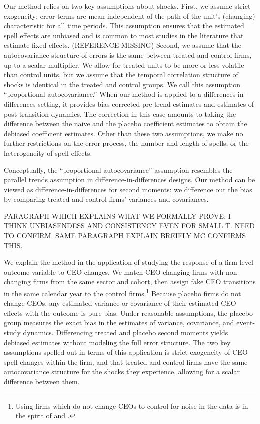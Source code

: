 \documentclass[11pt,a4paper]{article}
\begin{document}
Our method relies on two key assumptions about shocks. First, we assume strict exogeneity: error terms are mean independent of the path of the unit's (changing) characteristic for all time periods. This assumption ensures that the estimated spell effects are unbiased and is common to most studies in the literature that estimate fixed effects. (REFERENCE MISSING) Second, we assume that the autocovariance structure of errors is the same between treated and control firms, up to a scalar multiplier. We allow for treated units to be more or less volatile than control units, but we assume that the temporal correlation structure of shocks is identical in the treated and control groups. We call this assumption ``proportional autocovariance.'' When our method is applied to a differences-in-differences setting, it  provides bias corrected pre-trend estimates and estimates of post-transition dynamics. The correction in this case amounts to taking the difference between the naive and the placebo coefficient estimates to obtain the debiased coefficient estimates. Other than these two assumptions, we make no further restrictions on the error process, the number and length of spells, or the heterogeneity of spell effects.

Conceptually, the ``proportional autocovariance'' assumption resembles the parallel trends assumption in difference-in-differences designs. Our method can be viewed as difference-in-differences for second moments: we difference out the bias by comparing treated and control firms' variances and covariances. 

PARAGRAPH WHICH EXPLAINS WHAT WE FORMALLY PROVE. I THINK UNBIASENDESS AND CONSISTENCY EVEN FOR SMALL T. NEED TO CONFIRM. SAME PARAGRAPH EXPLAIN BREIFLY MC CONFIRMS THIS.

We explain the method in the application of studying the response of a firm-level outcome variable to CEO changes. We match CEO-changing firms with non-changing firms from the same sector and cohort, then assign fake CEO transitions in the same calendar year to the control firms.\footnote{Using firms which do not change CEOs to control for noise in the data is in the spirit of \cite{fitza2014use} and \cite{jarosiewicz2023revisiting}.} Because placebo firms do not change CEOs, any estimated variance or covariance of their estimated CEO effects with the outcome is pure bias. Under reasonable assumptions, the placebo group measures the exact bias in the estimates of variance, covariance, and event-study dynamics. Differencing treated and placebo second moments yields debiased estimates without modeling the full error structure. The two key assumptions spelled out in terms of this application is strict exogeneity of CEO spell changes within the firm, and that treated and control firms have the same autocovariance structure for the shocks they experience, allowing for a scalar difference between them.
\end{document}
